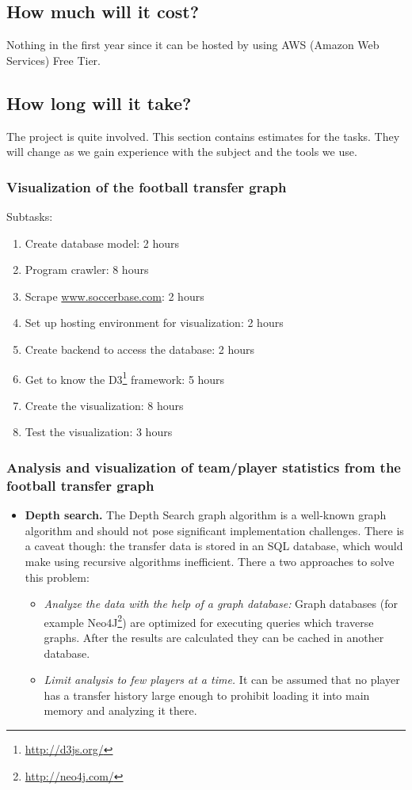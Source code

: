 \documentclass{article}
\begin{document}
\subsection{How much will it cost?}
Nothing in the first year since it can be hosted by using AWS (Amazon Web Services) Free Tier.

\subsection{How long will it take?}
The project is quite involved. This section contains estimates for the tasks. They will change as we gain experience with the subject and the tools we use.

\subsubsection{Visualization of the football transfer graph}
Subtasks:
\begin{enumerate}
\item Create database model: 2 hours
\item Program crawler: 8 hours
\item Scrape \url{www.soccerbase.com}: 2 hours
\item Set up hosting environment for visualization: 2 hours
\item Create backend to access the database: 2 hours
\item Get to know the D3\footnote{\url{http://d3js.org/}} framework: 5 hours
\item Create the visualization: 8 hours
\item Test the visualization: 3 hours
\end{enumerate}

\subsubsection{Analysis and visualization of team/player statistics from the football transfer graph}
\begin{itemize}
\item \textbf{Depth search.} The Depth Search graph algorithm is a well-known graph algorithm and should not pose significant implementation challenges. There is a caveat though: the transfer data is stored in an SQL database, which would make using recursive algorithms inefficient. There a two approaches to solve this problem:
	\begin{itemize}
	\item \textit{Analyze the data with the help of a graph database:} Graph databases (for example Neo4J\footnote{\url{http://neo4j.com/}}) are optimized for executing queries which traverse graphs. After the results are calculated they can be cached in another database.
	\item \textit{Limit analysis to few players at a time.} It can be assumed that no player has a transfer history large enough to prohibit loading it into main memory and analyzing it there.
	\end{itemize}
\end{itemize}
\end{document}
